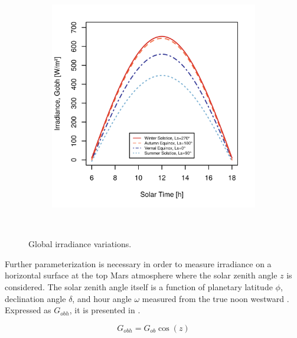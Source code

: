 \begin{figure}[h]
\begin{subfigure}[t]{\subfigureWidth}
            \includegraphics[height=\graphicsHeight]{sections/mars-solar-energy/solar-radiation/plots/gobh-diurnal-over-endaveaour-crater.png}
            \label{fig:plot:diurnal-variation-of-beam-irradiance-on-a-horizontal-surface-at-top-of-mars-atmosphere}
    \end{subfigure}\\[0.8ex]
    \caption[Global irradiance variations]
    {Global irradiance variations.}
    \label{fig:plot:global-irradiance}
\vspace{-2ex}
\end{figure}

\vspace{0.3cm}

Further parameterization is necessary in order to measure irradiance on a horizontal surface at the top Mars atmosphere where the solar zenith angle $z$ is considered. The solar zenith angle itself is a function of planetary latitude $\phi$, declination angle $\delta$, and hour angle $\omega$ measured from the true noon westward . Expressed as $G_{obh}$, it is presented in .

\begin{equation}
  \label{eq:G_obh}
  G_{obh} = G_{ob}\cos{(z)}
\end{equation}


